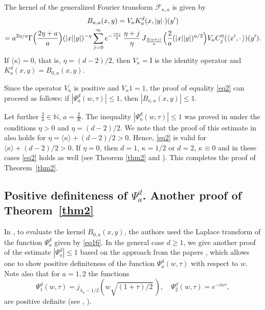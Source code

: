 \documentclass[12pt,twoside,reqno]{amsart}\usepackage[cp1251]{inputenc}
\theoremstyle{plain}
\newtheorem{theorem}{Theorem}[section]
\theoremstyle{remark}
\begin{document}
The kernel of the generalized Fourier transform $\mathcal{F}_{\kappa,a}$ is given by \cite[Chaps. 4, 5]{SKO12}
\begin{multline}\label{eq17}
B_{\kappa,a}(x,y)=V_{\kappa}K_{a}^d(x,|y|\cdot)(y')\\
=a^{2\eta/a}\Gamma\Bigl(\frac{2\eta+a}{a}\Bigr)(|x||y|)^{-\eta}\sum_{j=0}^{\infty}e^{-\frac{i\pi j}{a}}\,\frac{\eta+j}{\eta}\,J_{\frac{2(\eta+j)}{a}}\Bigl(\frac{2}{a}(|x||y|)^{a/2}\Bigr)V_{\kappa}C_{j}^{\eta}(\langle x',{\cdot}\,\rangle)(y').
\end{multline}
If $\langle \kappa\rangle=0$, that is, $\eta=(d-2)/2$, then $V_{\kappa}=\text{I}$ is the identity operator and $K_{a}^d(x,y)=B_{0,a}(x,y)$.


Since the operator $V_{\kappa}$ is positive and $V_{\kappa}1=1$, the proof of equality \eqref{eq2} %
 can proceed as follows:
if  $|\Psi_{a}^d(w,\tau)|\le 1$, then $|B_{\kappa,a}(x,y)|\le 1$.

Let further $\frac{2}{a}\in\mathbb{N}$, $a=\frac{2}{R}$. The inequality
$|\Psi_{a}^d(w,\tau)|\le 1$ was proved in \cite{CBL18} under the conditions $\eta>0$ and
$\eta=(d-2)/2$.
We note that the proof of this  estimate in \cite{CBL18}  %
also holds for $\eta=\langle \kappa\rangle+(d-2)/2>0$. Hence,
\eqref{eq2} is valid for $\langle \kappa\rangle+(d-2)/2>0$. If $\eta=0$, then
$d=1$, $\kappa=1/2$ or $d=2$, $\kappa\equiv0$ and in these cases
\eqref{eq2} holds as well (see Theorem \ref{thm2}  and \cite{BIE13}).
%
This completes the proof of  Theorem~\ref{thm2}.

\subsection{Positive definiteness of  $\Psi_{a}^d$.
Another proof of Theorem~\ref{thm2}}

In \cite{CBL18}, to evaluate the kernel $B_{0,a}(x,y)$, the authors used the Laplace transform of the function $\Psi_{a}^d$ given by  \eqref{eq16}.
In the general case  $d\ge 1$, we  give another proof of the estimate $|\Psi_{a}^d|\le 1$ based on the approach from the papers  \cite{BL20,DD21}, which allows one to show positive definiteness of the function $\Psi_{a}^d(w,\tau)$ with respect to $w$. Note  also that for $a=1,2$ the functions %
\begin{equation*}
\Psi_{1}^d(w,\tau)=j_{\lambda_{\kappa}-1/2}(w\sqrt{(1+\tau)/2}\,), \quad \Psi_{2}^d(w,\tau)=e^{-iw\tau},
\end{equation*}
are positive definite
(see \cite[Example 4.18]{SKO12}, \cite{CBL18}).
\end{document}
